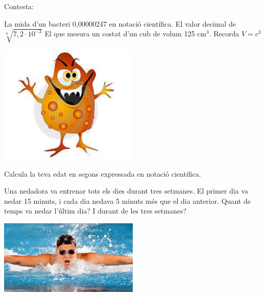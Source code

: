 \begin{mylist}
 \vspace{-1.5cm}
 \exer[2] \begin{minipage}[t]{0.7\textwidth}
 	 Contesta:
 	 \begin{tasks}
 	 	\task La mida d'un bacteri 0,00000247 en notació científica.
 	 	\task El valor decimal de $\sqrt[6]{7,2\cdot {10}^{-3}}$
 	 	\task  El que mesura un costat d'un cub de volum 125 cm${}^{3}$. Recorda $V=c^3$
 	 \end{tasks}
 \end{minipage}
 \begin{minipage}{0.3\textwidth}
 	\centering
 	\vspace{1.5cm}
 	\includegraphics[width=0.5\textwidth]{img-12/image2}
 \end{minipage}
 
	
 
	
	
		\exer[2]  Calcula la teva edat en segons expressada en notació científica.
	
	
  \vspace{-1.25cm}
  \exer[2] \begin{minipage}[t]{0.7\textwidth}
  	Una nedadora va entrenar tots els dies durant tres setmanes. El primer dia va nedar 15 minuts, i cada dia nedava 5 minuts més que el dia anterior. Quant de temps va nedar l'últim dia? I durant de les tres setmanes?  
  \end{minipage}
  \begin{minipage}{0.3\textwidth}
  	\centering
  	\vspace{1.5cm}
  	\includegraphics[width=0.5\textwidth]{img-12/image3}
  \end{minipage}
  

\end{mylist}
